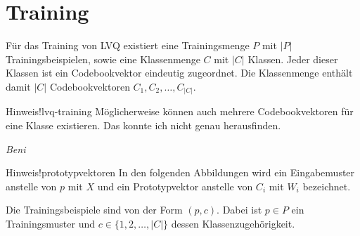 \section*{Training}
Für das Training von LVQ existiert eine Trainingsmenge $P$ mit $|P|$ Trainingsbeispielen, sowie eine Klassenmenge $C$ mit $|C|$ Klassen. Jeder dieser Klassen ist ein Codebookvektor eindeutig zugeordnet. Die Klassenmenge enthält damit $|C|$ Codebookvektoren $C_1, C_2, \ldots, C_{|C|}$.
\begin{hint}{Hinweis!}{lvq-training}
	Möglicherweise können auch mehrere Codebookvektoren für eine Klasse existieren. Das konnte ich nicht genau herausfinden.
	\begin{flushright}\textit{Beni}\end{flushright}
\end{hint}

\begin{hint}{Hinweis!}{prototypvektoren}
	In den folgenden Abbildungen wird ein Eingabemuster anstelle von $p$ mit $X$ und ein Prototypvektor anstelle von $C_i$ mit $W_i$ bezeichnet.
\end{hint}

Die Trainingsbeispiele sind von der Form $(p,c)$. Dabei ist $p \in P$ ein Trainingsmuster und $c \in \{1,2, \ldots, |C|\}$ dessen Klassenzugehörigkeit.

